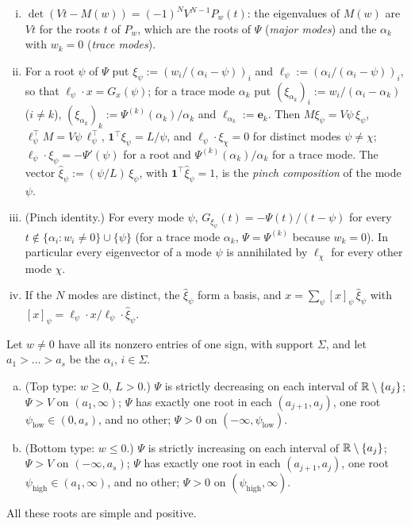 \documentclass[11pt,a4paper]{report}
\newcommand{\one}{\mathbf 1}
\newcommand{\bfe}{\mathbf e}
\begin{document}
\begin{lemma}\label{lem:spectrum}
\begin{enumerate}[(i)]
\item \(\det(Vt-M(w))=(-1)^NV^{N-1}P_w(t)\): the eigenvalues of \(M(w)\) are \(Vt\) for the roots \(t\) of \(P_w\), which are the
roots of \(\Psi\) (\emph{major modes}) and the \(\alpha_k\) with \(w_k=0\) (\emph{trace modes}).
\item For a root \(\psi\) of \(\Psi\) put \(\xi_\psi:=(w_i/(\alpha_i-\psi))_i\) and \(\ell_\psi:=(\alpha_i/(\alpha_i-\psi))_i\), so that
\(\ell_\psi\cdot x=G_x(\psi)\); for a trace mode \(\alpha_k\) put \((\xi_{\alpha_k})_i:=w_i/(\alpha_i-\alpha_k)\) (\(i\ne k\)),
\((\xi_{\alpha_k})_k:=\Psi^{(k)}(\alpha_k)/\alpha_k\) and \(\ell_{\alpha_k}:=\bfe_k\). Then \(M\xi_\psi=V\psi\,\xi_\psi\),
\(\ell_\psi^\top M=V\psi\,\ell_\psi^\top\), \(\one^\top\xi_\psi=L/\psi\), and \(\ell_\psi\cdot\xi_\chi=0\) for distinct modes
\(\psi\ne\chi\); \(\ell_\psi\cdot\xi_\psi=-\Psi'(\psi)\) for a root and \(\Psi^{(k)}(\alpha_k)/\alpha_k\) for a trace mode. The vector
\(\hat\xi_\psi:=(\psi/L)\,\xi_\psi\), with \(\one^\top\hat\xi_\psi=1\), is the \emph{pinch composition} of the mode \(\psi\).
\item (Pinch identity.) For every mode \(\psi\), \(G_{\xi_\psi}(t)=-\Psi(t)/(t-\psi)\) for every
\(t\notin\{\alpha_i:w_i\ne0\}\cup\{\psi\}\) (for a trace mode \(\alpha_k\), \(\Psi=\Psi^{(k)}\) because \(w_k=0\)). In particular every
eigenvector of a mode \(\psi\) is annihilated by \(\ell_\chi\) for every other mode \(\chi\).
\item If the \(N\) modes are distinct, the \(\hat\xi_\psi\) form a basis, and \(x=\sum_\psi[x]_\psi\,\hat\xi_\psi\) with
\([x]_\psi=\ell_\psi\cdot x/\ell_\psi\cdot\hat\xi_\psi\).
\end{enumerate}
\end{lemma}

\begin{lemma}\label{lem:onesigned}
Let \(w\ne0\) have all its nonzero entries of one sign, with support \(\Sigma\), and let \(a_1>\dots>a_s\) be the \(\alpha_i\), \(i\in\Sigma\).
\begin{enumerate}[(a)]
\item (Top type: \(w\ge0\), \(L>0\).) \(\Psi\) is strictly decreasing on each interval of \(\mathbb{R}\setminus\{a_j\}\); \(\Psi>V\) on
\((a_1,\infty)\); \(\Psi\) has exactly one root in each \((a_{j+1},a_j)\), one root \(\psi_{\mathrm{low}}\in(0,a_s)\), and no other;
\(\Psi>0\) on \((-\infty,\psi_{\mathrm{low}})\).
\item (Bottom type: \(w\le0\).) \(\Psi\) is strictly increasing on each interval of \(\mathbb{R}\setminus\{a_j\}\); \(\Psi>V\) on
\((-\infty,a_s)\); \(\Psi\) has exactly one root in each \((a_{j+1},a_j)\), one root \(\psi_{\mathrm{high}}\in(a_1,\infty)\), and no
other; \(\Psi>0\) on \((\psi_{\mathrm{high}},\infty)\).
\end{enumerate}
All these roots are simple and positive.
\end{lemma}
\end{document}
